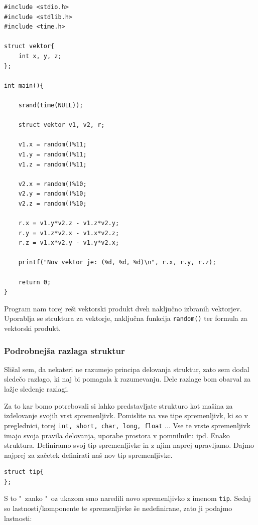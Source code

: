 \documentclass[a4paper, 12pt]{article}
\begin{document}
\pagebreak

\begin{lstlisting}[caption = Strukture: vektorski produkt]
#include <stdio.h>
#include <stdlib.h>
#include <time.h>

struct vektor{
	int x, y, z;
};

int main(){
	
	srand(time(NULL));
	
	struct vektor v1, v2, r;
	
	v1.x = random()%11;
	v1.y = random()%11;
	v1.z = random()%11;
	
	v2.x = random()%10;
	v2.y = random()%10;
	v2.z = random()%10;
	
	r.x = v1.y*v2.z - v1.z*v2.y;
	r.y = v1.z*v2.x - v1.x*v2.z;
	r.z = v1.x*v2.y - v1.y*v2.x;
	
	printf("Nov vektor je: (%d, %d, %d)\n", r.x, r.y, r.z);
	
	return 0;
}
\end{lstlisting}

Program nam torej reši vektorski produkt dveh naključno izbranih vektorjev. Uporablja se struktura za vektorje, naključna funkcija \lstinline|random()| ter formula za vektorski produkt.

\subsubsection{Podrobnejša razlaga struktur}

Slišal sem, da nekateri ne razumejo principa delovanja struktur, zato sem dodal sledečo razlago, ki naj bi pomagala k razumevanju. Dele razlage bom obarval za lažje sledenje razlagi.\

Za to kar bomo potrebovali si lahko predstavljate strukturo kot mašina za izdelovanje svojih vrst spremenljivk. Pomislite na vse tipe spremenljivk, ki so v preglednici, torej \lstinline|int, short, char, long, float| ... Vse te vrste spremenljivk imajo svoja pravila delovanja, uporabe prostora v pomnilniku ipd. Enako struktura. Definiramo svoj tip spremenljivke in z njim naprej upravljamo. Dajmo najprej za začetek definirati naš nov tip spremenljivke.

\begin{lstlisting}
struct tip{
};
\end{lstlisting}

S to "\ zanko "\ oz ukazom smo naredili novo spremenljivko z imenom \lstinline|tip|. Sedaj so lastnosti/komponente te spremenljivke še nedefinirane, zato ji podajmo lastnosti:
\end{document}
